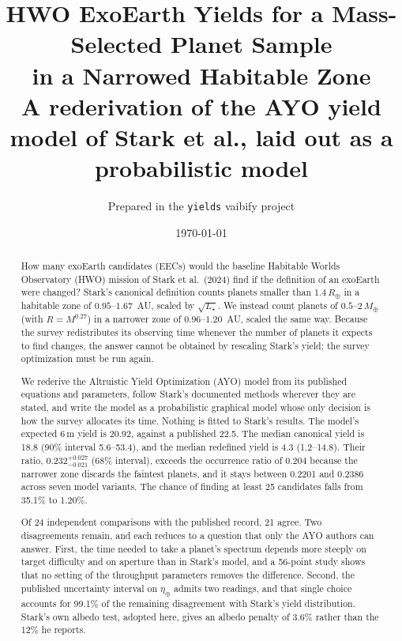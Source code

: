 \documentclass[11pt,a4paper]{article}
\title{\bfseries HWO ExoEarth Yields for a Mass-Selected Planet Sample\\
in a Narrowed Habitable Zone\\[0.3em]
\large A rederivation of the AYO yield model of Stark et al., laid out as a probabilistic model}
\author{Prepared in the \texttt{yields} vaibify project}
\date{\today}
\begin{document}
\maketitle

\begin{abstract}
\noindent
How many exoEarth candidates (EECs) would the baseline Habitable Worlds Observatory (HWO)
mission of Stark et al.\ (2024) find if the definition of an exoEarth were changed? Stark's
canonical definition counts planets smaller than $1.4\,R_\oplus$ in a habitable zone of
$0.95$--$1.67$~AU, scaled by $\sqrt{L_\star}$. We instead count planets of $0.5$--$2\,M_\oplus$
(with $R = M^{0.27}$) in a narrower zone of $0.96$--$1.20$~AU, scaled the same way. Because the
survey redistributes its observing time whenever the number of planets it expects to find changes,
the answer cannot be obtained by rescaling Stark's yield; the survey optimization must be run
again.

We rederive the Altruistic Yield Optimization (AYO) model from its published equations and
parameters, follow Stark's documented methods wherever they are stated, and write the model as a
probabilistic graphical model whose only decision is how the survey allocates its time. Nothing is
fitted to Stark's results. The model's expected 6\,m yield is 20.92, against a published
22.5. The median canonical yield is 18.8 (90\% interval 5.6--53.4), and the
median redefined yield is 4.3 (1.2--14.8). Their ratio,
$0.232^{+0.027}_{-0.021}$ (68\% interval), exceeds the occurrence ratio of $0.204$
because the narrower zone discards the faintest planets, and it stays between 0.2201
and 0.2386 across seven model variants. The chance of finding at least 25 candidates falls from 35.1\% to
1.20\%.

Of 24 independent comparisons with the published record, 21 agree. Two
disagreements remain, and each reduces to a question that only the AYO authors can answer. First,
the time needed to take a planet's spectrum depends more steeply on target difficulty and on
aperture than in Stark's model, and a 56-point study shows that no setting of the
throughput parameters removes the difference. Second, the published uncertainty interval on
$\eta_\oplus$ admits two readings, and that single choice accounts for 99.1\% of the
remaining disagreement with Stark's yield distribution. Stark's own albedo test, adopted here,
gives an albedo penalty of 3.6\% rather than the 12\% he reports.
\end{abstract}

\tableofcontents
\end{document}
